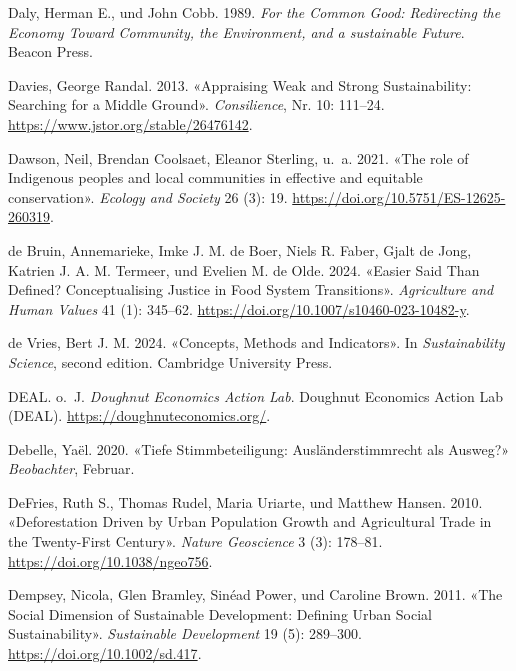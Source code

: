 \documentclass[
  nswissgerman,
  a4paper,
  openany]{book}
\newlength{\cslhangindent}
\newenvironment{CSLReferences}[2] %
 {\begin{list}{}{%
  \setlength{\itemindent}{0pt}
  \setlength{\leftmargin}{0pt}
  \setlength{\parsep}{0pt}
  \ifodd #1
   \setlength{\leftmargin}{\cslhangindent}
   \setlength{\itemindent}{-1\cslhangindent}
  \fi
  \setlength{\itemsep}{#2\baselineskip}}}
 {\end{list}}
\begin{document}
\begin{CSLReferences}{1}{1}
Daly, Herman E., und John Cobb. 1989. \emph{For the {Common} {Good}:
{Redirecting} the {Economy} {Toward} {Community}, the {Environment}, and
a sustainable {Future}}. Beacon Press.

Davies, George Randal. 2013. {«Appraising {Weak} and {Strong
Sustainability}: {Searching} for a {Middle Ground}»}.
\emph{Consilience}, Nr. 10: 111--24.
\url{https://www.jstor.org/stable/26476142}.

Dawson, Neil, Brendan Coolsaet, Eleanor Sterling, u.~a. 2021. {«The role
of {Indigenous} peoples and local communities in effective and equitable
conservation»}. \emph{Ecology and Society} 26 (3): 19.
\url{https://doi.org/10.5751/ES-12625-260319}.

{de Bruin, Annemarieke, Imke J. M. de Boer, Niels R. Faber, Gjalt de
Jong, Katrien J. A. M. Termeer, und Evelien M. de Olde}. 2024. {«Easier
Said Than Defined? {Conceptualising} Justice in Food System
Transitions»}. \emph{Agriculture and Human Values} 41 (1): 345--62.
\url{https://doi.org/10.1007/s10460-023-10482-y}.

{de Vries, Bert J. M.} 2024. {«Concepts, {Methods} and {Indicators}»}.
In \emph{Sustainability {Science}}, second edition. Cambridge University
Press.

DEAL. o.~J. \emph{Doughnut {Economics} {Action} {Lab}}. Doughnut
Economics Action Lab (DEAL). \url{https://doughnuteconomics.org/}.

Debelle, Yaël. 2020. {«{Tiefe Stimmbeteiligung: Ausl{ä}nderstimmrecht
als Ausweg?}»} \emph{Beobachter}, Februar.

DeFries, Ruth S., Thomas Rudel, Maria Uriarte, und Matthew Hansen. 2010.
{«Deforestation Driven by Urban Population Growth and Agricultural Trade
in the Twenty-First Century»}. \emph{Nature Geoscience} 3 (3): 178--81.
\url{https://doi.org/10.1038/ngeo756}.

Dempsey, Nicola, Glen Bramley, Sinéad Power, und Caroline Brown. 2011.
{«The Social Dimension of Sustainable Development: {Defining} Urban
Social Sustainability»}. \emph{Sustainable Development} 19 (5):
289--300. \url{https://doi.org/10.1002/sd.417}.


\end{CSLReferences}
\end{document}

